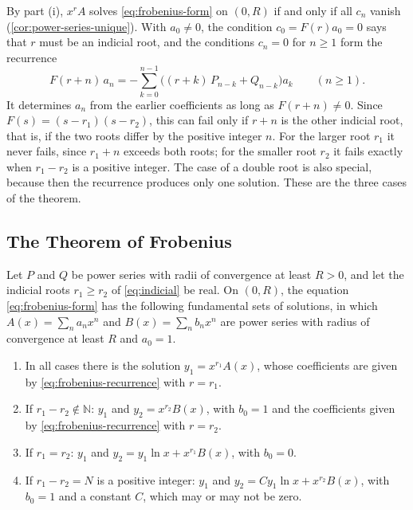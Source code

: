 By part (i), $x^rA$ solves \eqref{eq:frobenius-form} on $(0,R)$ if and only if all $c_n$ vanish (\cref{cor:power-series-unique}). With $a_0\ne0$, the condition $c_0=F(r)a_0=0$ says that $r$ must be an indicial root, and the conditions $c_n=0$ for $n\ge1$ form the recurrence
\begin{equation}
F(r+n)\,a_n=-\sum_{k=0}^{n-1}\bigl((r+k)\,P_{n-k}+Q_{n-k}\bigr)a_k\qquad(n\ge1).
\label{eq:frobenius-recurrence}
\end{equation}
It determines $a_n$ from the earlier coefficients as long as $F(r+n)\ne0$. Since $F(s)=(s-r_1)(s-r_2)$, this can fail only if $r+n$ is the other indicial root, that is, if the two roots differ by the positive integer $n$. For the larger root $r_1$ it never fails, since $r_1+n$ exceeds both roots; for the smaller root $r_2$ it fails exactly when $r_1-r_2$ is a positive integer. The case of a double root is also special, because then the recurrence produces only one solution. These are the three cases of the theorem.

\subsection{The Theorem of Frobenius}

\begin{theorem}[Frobenius]
\label{thm:frobenius}
Let $P$ and $Q$ be power series with radii of convergence at least $R>0$, and let the indicial roots $r_1\ge r_2$ of \eqref{eq:indicial} be real. On $(0,R)$, the equation \eqref{eq:frobenius-form} has the following fundamental sets of solutions, in which $A(x)=\sum_na_nx^n$ and $B(x)=\sum_nb_nx^n$ are power series with radius of convergence at least $R$ and $a_0=1$.
\begin{enumerate}
\item In all cases there is the solution $y_1=x^{r_1}A(x)$, whose coefficients are given by \eqref{eq:frobenius-recurrence} with $r=r_1$.
\item If $r_1-r_2\notin\mathbb N$: $y_1$ and $y_2=x^{r_2}B(x)$, with $b_0=1$ and the coefficients given by \eqref{eq:frobenius-recurrence} with $r=r_2$.
\item If $r_1=r_2$: $y_1$ and $y_2=y_1\ln x+x^{r_1}B(x)$, with $b_0=0$.
\item If $r_1-r_2=N$ is a positive integer: $y_1$ and $y_2=Cy_1\ln x+x^{r_2}B(x)$, with $b_0=1$ and a constant $C$, which may or may not be zero.
\end{enumerate}
\end{theorem}

